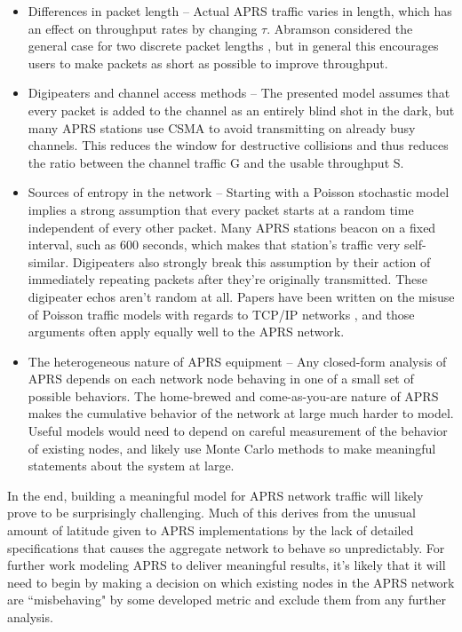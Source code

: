 \begin{itemize}
	\item Differences in packet length -- Actual APRS traffic varies in length,
		which has an effect on throughput rates by changing $\tau$.
		Abramson considered the general
		case for two discrete packet lengths \cite{packetthroughput},
		but in general this encourages users to make packets as short as possible
		to improve throughput.
	\item Digipeaters and channel access methods -- The presented model assumes that
		every packet is added to the channel as an entirely blind shot in the dark,
		but many APRS stations use CSMA to avoid transmitting on already busy channels.
		This reduces the window for destructive collisions and thus reduces the ratio
		between the channel traffic G and the usable throughput S.
	\item Sources of entropy in the network -- Starting with a Poisson stochastic model
		implies a strong assumption that every packet starts at a random time independent
		of every other packet. Many APRS stations beacon on a fixed interval,
		such as 600 seconds, which makes that station's traffic very self-similar.
		Digipeaters also strongly break this assumption by their action of immediately
		repeating packets after they're originally transmitted.
		These digipeater echos aren't random at all.
		Papers have been written on the misuse of Poisson traffic models with regards
		to TCP/IP networks \cite{failureofpoisson}, and those arguments often apply
		equally well to the APRS network.
	\item The heterogeneous nature of APRS equipment -- Any closed-form analysis
		of APRS depends on each network node behaving in one of a small set 
		of possible behaviors. The home-brewed and come-as-you-are nature of APRS
		makes the cumulative behavior of the network at large much harder to model.
		Useful models would need to depend on careful measurement of the behavior of
		existing nodes, and likely use Monte Carlo methods to make meaningful
		statements about the system at large.
\end{itemize}

In the end, building a meaningful model for APRS network traffic will likely prove
to be surprisingly challenging.
Much of this derives from the unusual amount of latitude given to APRS implementations
by the lack of detailed specifications that causes the aggregate network to behave so
unpredictably.
For further work modeling APRS to deliver meaningful results,
it's likely that it will need to begin by making a decision on which existing nodes in the
APRS network are ``misbehaving" by some developed metric and exclude them from
any further analysis.

